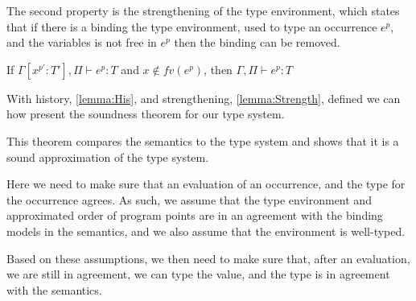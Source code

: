\documentclass[acmsmall,sigplan]{acmart}
\begin{document}
%

The second property is the strengthening of the type environment, which states that if there is a binding the type environment, used to type an occurrence $e^p$, and the variables is not free in $e^p$ then the binding can be removed.

\begin{lemma}[Strengthening]\label{lemma:Strength}
	If $\Gamma[x^{p'}:T'],\Pi\vdash e^{p}:T$ and $x\notin fv(e^p)$, then $\Gamma,\Pi\vdash e^{p}:T$
\end{lemma}
%

With history, \cref{lemma:His}, and strengthening,
\cref{lemma:Strength}, defined we can how present the soundness
theorem for our type system.

This theorem compares the semantics to the type system and shows that
it is a sound approximation of the type system.

Here we need to make sure that an
evaluation of an occurrence, and the type for the occurrence agrees. 
As such, we assume that the type environment and approximated order of
program points are in an agreement with the binding models in the
semantics, and we also assume that the environment is well-typed. 

Based on these assumptions, we then need to make sure that, after an
evaluation, we are still in agreement, we can type the value, and the
type is in agreement with the semantics. 
\end{document}
